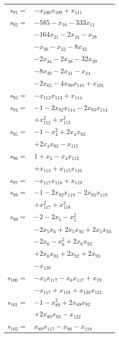\begin{longtable}{@{}r@{\;}l@{}}
\(s_{91}=\) & \(\displaystyle -x_{100}x_{109} +x_{111}\) \\[3pt]
\(s_{92}=\) & \(\displaystyle -585 -x_{10} -333x_{11}\) \\
 & \(\displaystyle -164x_{21} -2x_{24} -x_{28}\) \\
 & \(\displaystyle -x_{30} -x_{32} -8x_{33}\) \\
 & \(\displaystyle -2x_{34} -2x_{38} -32x_{39}\) \\
 & \(\displaystyle -8x_{40} -2x_{41} -x_{44}\) \\
 & \(\displaystyle -2x_{65} -4x_{99}x_{110} +x_{101}\) \\[3pt]
\(s_{93}=\) & \(\displaystyle -x_{112}x_{113} +x_{114}\) \\[3pt]
\(s_{94}=\) & \(\displaystyle -1 -2x_{92}x_{114} -2x_{93}x_{114}\) \\
 & \(\displaystyle +x_{112}^{2} +x_{113}^{2}\) \\[3pt]
\(s_{95}=\) & \(\displaystyle -1 -x_{4}^{2} +2x_{4}x_{92}\) \\
 & \(\displaystyle +2x_{4}x_{93} -x_{115}\) \\[3pt]
\(s_{96}=\) & \(\displaystyle 1 +x_{2} -x_{4}x_{112}\) \\
 & \(\displaystyle +x_{113} +x_{115}x_{116}\) \\[3pt]
\(s_{97}=\) & \(\displaystyle -x_{117}x_{118} +x_{119}\) \\[3pt]
\(s_{98}=\) & \(\displaystyle -1 -2x_{92}x_{119} -2x_{93}x_{119}\) \\
 & \(\displaystyle +x_{117}^{2} +x_{118}^{2}\) \\[3pt]
\(s_{99}=\) & \(\displaystyle -2 -2x_{5} -x_{5}^{2}\) \\
 & \(\displaystyle -2x_{5}x_{6} +2x_{5}x_{92} +2x_{5}x_{93}\) \\
 & \(\displaystyle -2x_{6} -x_{6}^{2} +2x_{6}x_{92}\) \\
 & \(\displaystyle +2x_{6}x_{93} +2x_{92} +2x_{93}\) \\
 & \(\displaystyle -x_{120}\) \\[3pt]
\(s_{100}=\) & \(\displaystyle -x_{5}x_{117} -x_{6}x_{117} +x_{19}\) \\
 & \(\displaystyle -x_{117} +x_{118} +x_{120}x_{121}\) \\[3pt]
\(s_{101}=\) & \(\displaystyle -1 -x_{89}^{2} +2x_{89}x_{92}\) \\
 & \(\displaystyle +2x_{89}x_{93} -x_{122}\) \\[3pt]
\(s_{102}=\) & \(\displaystyle x_{89}x_{117} -x_{90} -x_{118}\) \\

\end{longtable}
